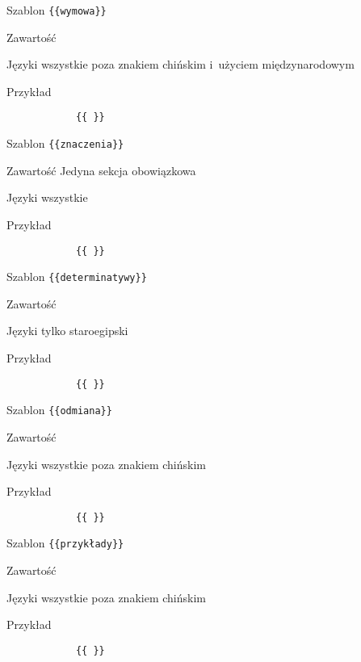 \documentclass{pracamgr}
\begin{document}
\spacer
\begin{description-sub}
	\item[Szablon] \verb|{{wymowa}}|
	\item[Zawartość]
	\item[Języki] wszystkie poza znakiem chińskim i~użyciem międzynarodowym
	\item[Przykład]
		\begin{verbatim}
			{{ }}
		\end{verbatim}
\end{description-sub}
\spacer
\begin{description-sub}
	\item[Szablon] \verb|{{znaczenia}}|
	\item[Zawartość] Jedyna sekcja obowiązkowa
	\item[Języki] wszystkie
	\item[Przykład]
		\begin{verbatim}
			{{ }}
		\end{verbatim}
\end{description-sub}
\spacer
\begin{description-sub}
	\item[Szablon] \verb|{{determinatywy}}|
	\item[Zawartość]
	\item[Języki] tylko staroegipski
	\item[Przykład]
		\begin{verbatim}
			{{ }}
		\end{verbatim}
\end{description-sub}
\spacer
\begin{description-sub}
	\item[Szablon] \verb|{{odmiana}}|
	\item[Zawartość]
	\item[Języki] wszystkie poza znakiem chińskim
	\item[Przykład]
		\begin{verbatim}
			{{ }}
		\end{verbatim}
\end{description-sub}
\spacer
\begin{description-sub}
	\item[Szablon] \verb|{{przykłady}}|
	\item[Zawartość]
	\item[Języki] wszystkie poza znakiem chińskim
	\item[Przykład]
		\begin{verbatim}
			{{ }}
		\end{verbatim}
\end{description-sub}
\end{document}
